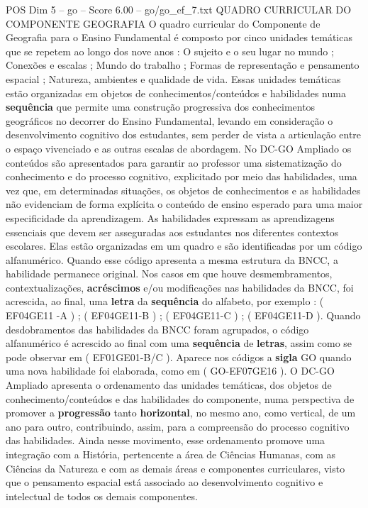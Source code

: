 \begin{textsample}{POS Dim 5 – go – Score 6.00 – go/go\_ef\_7.txt}  \label{ex:f5_pos_013}
QUADRO CURRICULAR DO COMPONENTE GEOGRAFIA O quadro curricular do Componente de Geografia para o Ensino Fundamental é composto por cinco unidades temáticas que se repetem ao longo dos nove anos : O sujeito e o seu lugar no mundo ; Conexões e escalas ; Mundo do trabalho ; Formas de representação e pensamento espacial ; Natureza, ambientes e qualidade de vida.
Essas unidades temáticas estão organizadas em objetos de conhecimentos/conteúdos e habilidades numa \textbf{sequência} que permite uma construção progressiva dos conhecimentos geográficos no decorrer do Ensino Fundamental, levando em consideração o desenvolvimento cognitivo dos estudantes, sem perder de vista a articulação entre o espaço vivenciado e as outras escalas de abordagem.
No DC-GO Ampliado os conteúdos são apresentados para garantir ao professor uma sistematização do conhecimento e do processo cognitivo, explicitado por meio das habilidades, uma vez que, em determinadas situações, os objetos de conhecimentos e as habilidades não evidenciam de forma explícita o conteúdo de ensino esperado para uma maior especificidade da aprendizagem.
As habilidades expressam as aprendizagens essenciais que devem ser asseguradas aos estudantes nos diferentes contextos escolares.
Elas estão organizadas em um quadro e são identificadas por um código alfanumérico.
Quando esse código apresenta a mesma estrutura da BNCC, a habilidade permanece original.
Nos casos em que houve desmembramentos, contextualizações, \textbf{acréscimos} e/ou modificações nas habilidades da BNCC, foi acrescida, ao final, uma \textbf{letra} da \textbf{sequência} do alfabeto, por exemplo : ( EF04GE11 -A ) ; ( EF04GE11-B ) ; ( EF04GE11-C ) ; ( EF04GE11-D ).
Quando desdobramentos das habilidades da BNCC foram agrupados, o código alfanumérico é acrescido ao final com uma \textbf{sequência} de \textbf{letras}, assim como se pode observar em ( EF01GE01-B/C ).
Aparece nos códigos a \textbf{sigla} GO quando uma nova habilidade foi elaborada, como em ( GO-EF07GE16 ).
O DC-GO Ampliado apresenta o ordenamento das unidades temáticas, dos objetos de conhecimento/conteúdos e das habilidades do componente, numa perspectiva de promover a \textbf{progressão} tanto \textbf{horizontal}, no mesmo ano, como vertical, de um ano para outro, contribuindo, assim, para a compreensão do processo cognitivo das habilidades.
Ainda nesse movimento, esse ordenamento promove uma integração com a História, pertencente a área de Ciências Humanas, com as Ciências da Natureza e com as demais áreas e componentes curriculares, visto que o pensamento espacial está associado ao desenvolvimento cognitivo e intelectual de todos os demais componentes.

\end{textsample}
